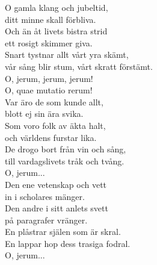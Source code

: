 \documentclass[a6paper, 10pt, twoside]{article}
\begin{document}


\noindent
\vspace{20pt} 
\begin{center}
\end{center}
\begin{lyrics}
O gamla klang och jubeltid,\\
ditt minne skall förbliva.\\
Och än åt livets bistra strid\\
ett rosigt skimmer giva.\\
Snart tystnar allt vårt yra skämt,\\
vår sång blir stum, vårt skratt förstämt.\\
O, jerum, jerum, jerum!\\
O, quae mutatio rerum!
\vspace{5pt}\\
Var äro de som kunde allt,\\
blott ej sin ära svika.\\
Som voro folk av äkta halt,\\
och världens furstar lika.\\
De drogo bort från vin och sång,\\
till vardagslivets tråk och tvång.\\
O, jerum...
\vspace{5pt}\\
Den ene vetenskap och vett\\
in i scholares mänger.\\
Den andre i sitt anlets svett\\
på paragrafer vränger.\\
En plåstrar själen som är skral.\\
En lappar hop dess trasiga fodral.\\
O, jerum...


\end{lyrics}
\end{document}
